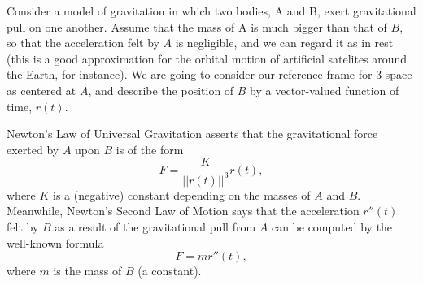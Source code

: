 \documentclass[11pt]{exam}
\begin{document}
\begin{questions}
\newpage

\addpoints
\question Consider a model of gravitation in which two bodies, A and B, exert gravitational pull on one another. Assume that the mass of A is much bigger than that of $B$, so that the acceleration felt by $A$ is negligible, and we can regard it as in rest (this is a good approximation for the orbital motion of artificial satelites around the Earth, for instance). We are going to consider our reference frame for 3-space as centered at $A$, and describe the position of $B$ by a vector-valued function of time, $r(t)$. 

Newton's Law of Universal Gravitation asserts that the gravitational force exerted by $A$ upon $B$ is of the form
\begin{equation*}
F=\frac{K}{||r(t)||^3} r(t),
\end{equation*}
where $K$ is a (negative) constant depending on the masses of $A$ and $B$. Meanwhile, Newton's Second Law of Motion says that the acceleration $r''(t)$ felt by $B$ as a result of the gravitational pull from $A$ can be computed by the well-known formula
\begin{equation*}
F=m r''(t),
\end{equation*}
where $m$ is the mass of $B$ (a constant). 



\end{questions}
\end{document}
